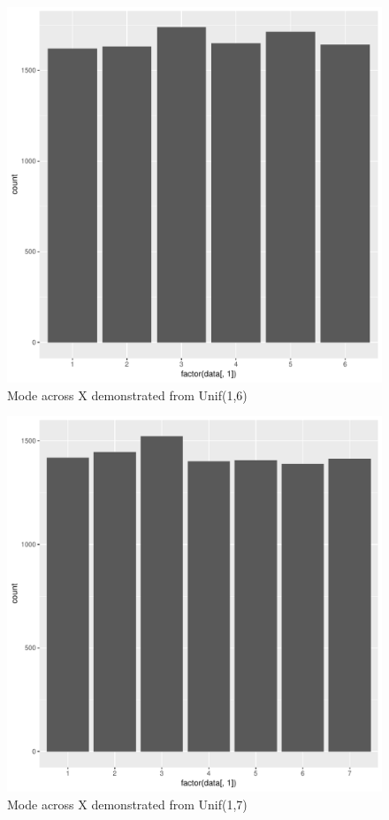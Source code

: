 \documentclass[11pt]{article}
\begin{document}
\begin{enumerate}
\begin{enumerate}
\begin{figure}[H]
	\end{figure}
	\begin{figure}[H]
		\centering
		\caption{Mode across X demonstrated from Unif(1,6)}
		\includegraphics[scale=.4]{6graph.pdf}
	\end{figure}
	\begin{figure}[H]
		\centering
		\caption{Mode across X demonstrated from Unif(1,7)}
		\includegraphics[scale=.4]{7graph.pdf}

\end{figure}
\end{enumerate}
\end{enumerate}
\end{document}
